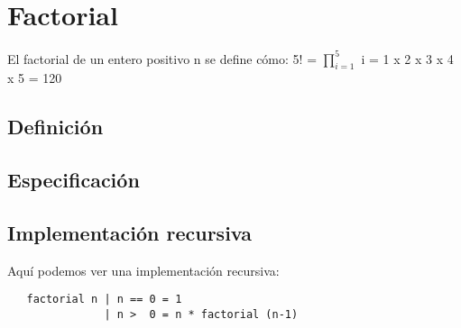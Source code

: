 \documentclass{article}
\begin{document}
\section{Factorial}


El factorial de un entero positivo n se define cómo: 5! = $\prod_{i=1}^{5}$ i = 1 x 2 x 3 x 4 x 5 = 120 



\subsection{Definición}



\subsection{Especificación}


\subsection{Implementación recursiva}

Aquí podemos ver una implementación recursiva:

\begin{verbatim}
   factorial n | n == 0 = 1
               | n >  0 = n * factorial (n-1)
\end{verbatim}
\end{document}
